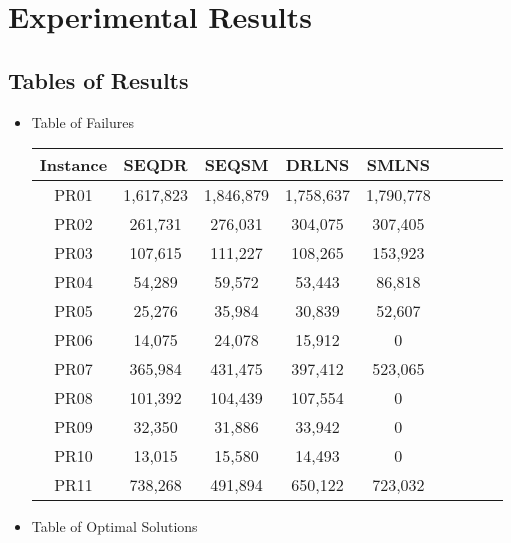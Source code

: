 \section{Experimental Results}
\subsection{Tables of Results}
\begin{itemize}
    \item Table of Failures
    
        \begin{table}[!h]
    \label{T:instances}
        \begin{center}
        \begin{tabular}{| c | c | c | c | c | c | c | c | c | }
\hline

\textbf{Instance} & \textbf{SEQDR} & \textbf{SEQSM} & \textbf{DRLNS} & \textbf{SMLNS}  \\
\hline
PR01 & 1,617,823  & 1,846,879 &  1,758,637 & 1,790,778\\ \hline
PR02 & 261,731  & 276,031  &  304,075 & 307,405  \\ \hline
PR03 & 107,615  & 111,227 &  108,265 & 153,923 \\ \hline
PR04 & 54,289  & 59,572 &  53,443 & 86,818  \\ \hline
PR05 & 25,276  & 35,984 &  30,839 & 52,607  \\ \hline
PR06 & 14,075  & 24,078 & 15,912 & 0 \\ \hline
PR07 & 365,984  & 431,475 &  397,412 & 523,065  \\ \hline
PR08 & 101,392  & 104,439 &  107,554 & 0  \\ \hline
PR09 & 32,350  & 31,886 &  33,942 & 0  \\ \hline
PR10 & 13,015  & 15,580  &  14,493 & 0  \\ \hline
PR11 & 738,268  & 491,894 &  650,122 & 723,032  \\ \hline
\hline
\end{tabular}
\end{center}
\end{table}

    \item Table of Optimal Solutions
        \begin{table}[!h]
    \label{T:instances}
        \begin{center}
        \begin{tabular}{| c | c | c | c | c | c | c | c | c | }
\hline


\end{tabular}
\end{center}
\end{table}
\end{itemize}

